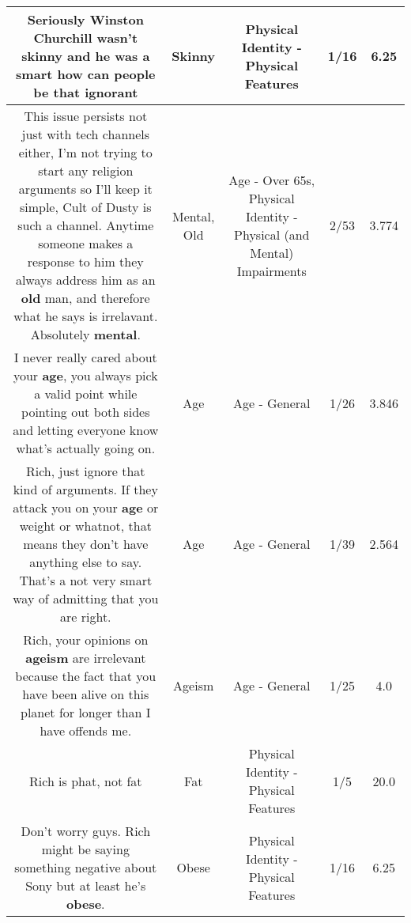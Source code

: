 \documentclass[11pt]{article}
\newlength\mylength
\begin{document}
\begin{center}
\begin{longtable}{|C{.65\mylength}|C{.30\mylength}|C{.12\mylength}|C{.12\mylength}|C{.12\mylength}|}
  \small Seriously Winston Churchill wasn't \textbf{skinny} and he was a smart how can people be that ignorant\normalsize   & Skinny & Physical Identity - Physical Features & 1/16 & 6.25 \\  \hline
  \small This issue persists not just with tech channels either, I'm not trying to start any religion arguments so I'll keep it simple, Cult of Dusty is such a channel. Anytime someone makes a response to him they always address him as an \textbf{old} man, and therefore what he says is irrelavant. Absolutely \textbf{mental}.\normalsize   & Mental, Old & Age - Over 65s, Physical Identity - Physical (and Mental) Impairments & 2/53 & 3.774 \\  \hline
  \small I never really cared about your \textbf{age}, you always pick a valid point while pointing out both sides and letting everyone know what's actually going on.\normalsize   & Age & Age - General & 1/26 & 3.846 \\  \hline
  \small Rich, just ignore that kind of arguments. If they attack you on your \textbf{age} or weight or whatnot, that means they don't have anything else to say. That's a not very smart way of admitting that you are right.\normalsize   & Age & Age - General & 1/39 & 2.564 \\  \hline
  \small Rich, your opinions on \textbf{ageism} are irrelevant because the fact that you have been alive on this planet for longer than I have offends me.\normalsize   & Ageism & Age - General & 1/25 & 4.0 \\  \hline
  \small Rich is phat, not fat\normalsize   & Fat & Physical Identity - Physical Features & 1/5 & 20.0 \\  \hline
  \small Don't worry guys. Rich might be saying something negative about Sony but at least he's \textbf{obese}.\normalsize   & Obese & Physical Identity - Physical Features & 1/16 & 6.25 \\  \hline

\end{longtable}
\end{center}
\end{document}
